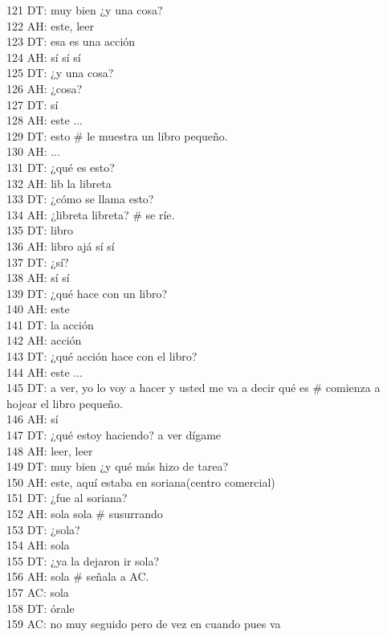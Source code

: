 121 DT: muy bien ¿y una cosa?\\
122 AH: este, leer\\
123 DT: esa es una acción\\
124 AH: sí sí sí\\
125 DT: ¿y una cosa?\\
126 AH: ¿cosa?\\
127 DT: sí\\
128 AH: este ...\\
129 DT: esto \# le muestra un libro pequeño.\\
130 AH: ...\\
131 DT: ¿qué es esto?\\
132 AH: lib la libreta\\
133 DT: ¿cómo se llama esto?\\
134 AH: ¿libreta libreta? \# se ríe.\\
135 DT: libro\\
136 AH: libro ajá sí sí\\
137 DT: ¿sí?\\
138 AH: sí sí\\
139 DT: ¿qué hace con un libro?\\
140 AH: este\\
141 DT: la acción\\
142 AH: acción\\
143 DT: ¿qué acción hace con el libro?\\
144 AH: este ...\\
145 DT: a ver, yo lo voy a hacer y usted me va a decir qué es \# comienza a hojear el libro pequeño.\\
146 AH: sí\\
147 DT: ¿qué estoy haciendo? a ver dígame\\
148 AH: leer, leer\\
149 DT: muy bien ¿y qué más hizo de tarea?\\
150 AH: este, aquí estaba en soriana(centro comercial)\\
151 DT: ¿fue al soriana?\\
152 AH: sola sola \# susurrando\\
153 DT: ¿sola?\\
154 AH: sola\\
155 DT: ¿ya la dejaron ir sola?\\
156 AH: sola \# señala a AC.\\
157 AC: sola\\
158 DT: órale\\
159 AC: no muy seguido pero de vez en cuando pues va\\
